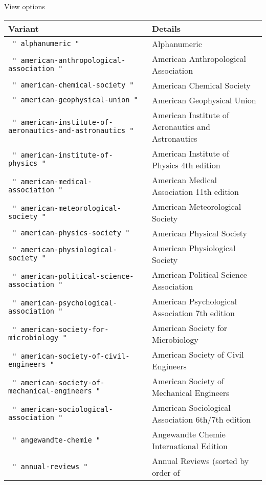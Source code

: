
View options

\begin{longtable}[]{@{}ll@{}}
\toprule\noalign{}
Variant & Details \\
\midrule\noalign{}
\endhead
\bottomrule\noalign{}
\endlastfoot
\texttt{\ "\ alphanumeric\ "\ } & Alphanumeric \\
\texttt{\ "\ american-anthropological-association\ "\ } & American
Anthropological Association \\
\texttt{\ "\ american-chemical-society\ "\ } & American Chemical
Society \\
\texttt{\ "\ american-geophysical-union\ "\ } & American Geophysical
Union \\
\texttt{\ "\ american-institute-of-aeronautics-and-astronautics\ "\ } &
American Institute of Aeronautics and Astronautics \\
\texttt{\ "\ american-institute-of-physics\ "\ } & American Institute of
Physics 4th edition \\
\texttt{\ "\ american-medical-association\ "\ } & American Medical
Association 11th edition \\
\texttt{\ "\ american-meteorological-society\ "\ } & American
Meteorological Society \\
\texttt{\ "\ american-physics-society\ "\ } & American Physical
Society \\
\texttt{\ "\ american-physiological-society\ "\ } & American
Physiological Society \\
\texttt{\ "\ american-political-science-association\ "\ } & American
Political Science Association \\
\texttt{\ "\ american-psychological-association\ "\ } & American
Psychological Association 7th edition \\
\texttt{\ "\ american-society-for-microbiology\ "\ } & American Society
for Microbiology \\
\texttt{\ "\ american-society-of-civil-engineers\ "\ } & American
Society of Civil Engineers \\
\texttt{\ "\ american-society-of-mechanical-engineers\ "\ } & American
Society of Mechanical Engineers \\
\texttt{\ "\ american-sociological-association\ "\ } & American
Sociological Association 6th/7th edition \\
\texttt{\ "\ angewandte-chemie\ "\ } & Angewandte Chemie International
Edition \\
\texttt{\ "\ annual-reviews\ "\ } & Annual Reviews (sorted by order of

\end{longtable}

